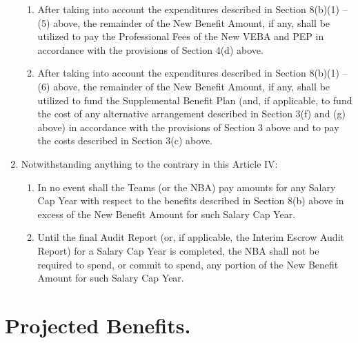 \documentclass[
]{book}
\providecommand{\tightlist}{%
  \setlength{\itemsep}{0pt}\setlength{\parskip}{0pt}}
\begin{document}
\begin{enumerate}
\begin{enumerate}
  \item
    After taking into account the expenditures described in Section 8(b)(1) -- (5) above, the remainder of the New Benefit Amount, if any, shall be utilized to pay the Professional Fees of the New VEBA and PEP in accordance with the provisions of Section 4(d) above.
  \item
    After taking into account the expenditures described in Section 8(b)(1) -- (6) above, the remainder of the New Benefit Amount, if any, shall be utilized to fund the Supplemental Benefit Plan (and, if applicable, to fund the cost of any alternative arrangement described in Section 3(f) and (g) above) in accordance with the provisions of Section 3 above and to pay the costs described in Section 3(c) above.
  \end{enumerate}
\item
  Notwithstanding anything to the contrary in this Article IV:

  \begin{enumerate}
  \def\labelenumii{(\arabic{enumii})}
  \tightlist
  \item
    In no event shall the Teams (or the NBA) pay amounts for any Salary Cap Year with respect to the benefits described in Section 8(b) above in excess of the New Benefit Amount for such Salary Cap Year.
  \item
    Until the final Audit Report (or, if applicable, the Interim Escrow Audit Report) for a Salary Cap Year is completed, the NBA shall not be required to spend, or commit to spend, any portion of the New Benefit Amount for such Salary Cap Year.
  \end{enumerate}
\end{enumerate}

\hypertarget{projected-benefits.}{%
\section{Projected Benefits.}\label{projected-benefits.}}
\end{document}
